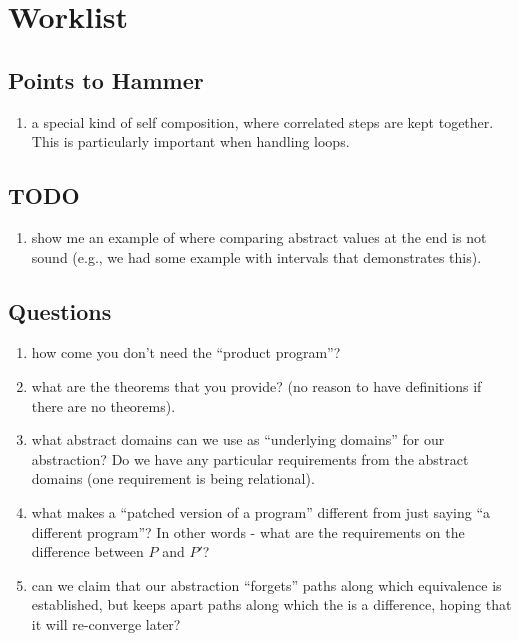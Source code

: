 \section{Worklist}

\subsection{Points to Hammer}

\begin{enumerate}
\item a special kind of self composition, where correlated steps are kept together. This is particularly important when handling loops.
\end{enumerate}

\subsection{TODO}
\begin{enumerate}
\item show me an example of where comparing abstract values at the end is not sound (e.g., we had some example with intervals that demonstrates this).
\end{enumerate}


\subsection{Questions}

\begin{enumerate}
\item how come you don't need the ``product program''?
\item what are the theorems that you provide? (no reason to have definitions if there are no theorems).
\item what abstract domains can we use as ``underlying domains'' for our abstraction? Do we have any particular requirements from the abstract domains (one requirement is being relational).
\item what makes a ``patched version of a program'' different from just saying ``a different program''? In other words - what are the requirements on the difference between $P$ and $P'$?
\item can we claim that our abstraction ``forgets'' paths along which equivalence is established, but keeps apart paths along which the is a difference, hoping that it will re-converge later?
\end{enumerate} 